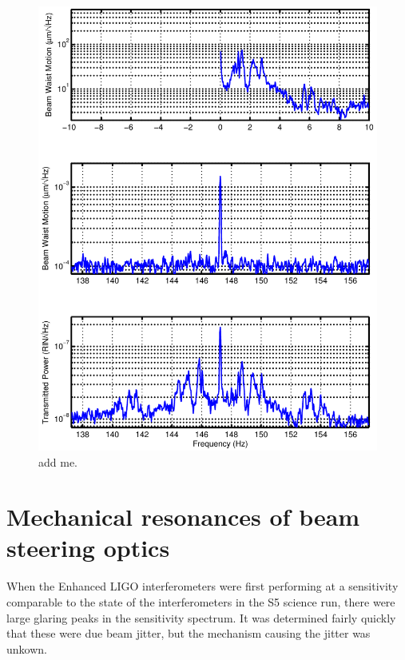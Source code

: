 \begin{figure}
  \begin{center}
  \leavevmode
  \includegraphics{figs-jitter/bilinearplot.pdf}
  \end{center}
  \caption[add me]{add me. }
  \label{fig:bilinear}
\end{figure}

\section{Mechanical resonances of beam steering optics}
When the Enhanced LIGO interferometers were first performing at a sensitivity comparable to the state of the interferometers in the S5 science run, there were large glaring peaks in the sensitivity spectrum. %
It was determined fairly quickly that these were due beam jitter, but the mechanism causing the jitter was unkown.

